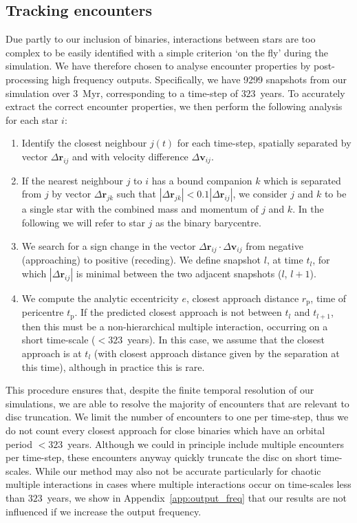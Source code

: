 \documentclass{aa}
\begin{document}
\subsection{Tracking encounters}
\label{sec:encounters}
Due partly to our inclusion of binaries, interactions between stars are too complex to be easily identified with a simple criterion `on the fly' during the simulation. We have therefore chosen to analyse encounter properties by post-processing high frequency outputs. Specifically, we have 9299 snapshots from our simulation over $3$~Myr, corresponding to a time-step of $323$~years. To accurately extract the correct encounter properties, we then perform the following analysis for each star $i$:
\begin{enumerate}
    \item Identify the closest neighbour $j(t)$ for each time-step, spatially separated by vector $\Delta \bm{r}_{ij}$ and with velocity difference $\Delta \bm{v}_{ij}$.
    \item If the nearest neighbour $j$ to $i$ has a bound companion $k$ which is separated from $j$ by vector $\Delta \bm{r}_{jk}$ such that $|\Delta \bm{r}_{jk}|<0.1 |\Delta \bm{r}_{ij}|$, we consider $j$ and $k$ to be a single star with the combined mass and momentum of $j$ and $k$. In the following we will refer to star $j$ as the binary barycentre. 
    \item We search for a sign change in the vector $\Delta \bm{r}_{ij} \cdot \Delta \bm{v}_{ij}$ from negative (approaching) to positive (receding). We define snapshot $l$, at time $t_l$, for which $|\Delta \bm{r}_{ij}|$ is minimal between the two adjacent snapshots ($l$, $l+1$).
    \item We compute the analytic eccentricity $e$, closest approach distance $r_\mathrm{p}$, time of pericentre $t_\mathrm{p}$. If the predicted closest approach is not between $t_l$ and $t_{l+1}$, then this must be a non-hierarchical multiple interaction, occurring on a short time-scale ($<323$~years). In this case, we assume that the closest approach is at $t_l$ (with closest approach distance given by the separation at this time), although in practice this is rare.
\end{enumerate}

This procedure ensures that, despite the finite temporal resolution of our simulations, we are able to resolve {the majority of} encounters that are relevant to disc truncation. We limit the number of encounters to one per time-step, thus we do not count every closest approach for close binaries which have an orbital period $<323$~years. Although we could in principle include multiple encounters per time-step, these encounters anyway quickly truncate the disc on short time-scales. {While our method may also not be accurate particularly for chaotic multiple interactions in cases where multiple interactions occur on time-scales less than $323$~years, we show in Appendix~\ref{app:output_freq} that our results are not influenced if we increase the output frequency.}
\end{document}
